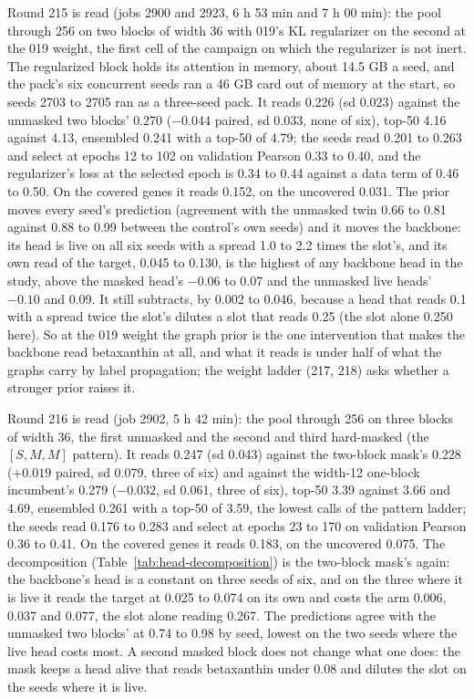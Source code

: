 Round 215 is read (jobs 2900 and 2923, 6 h 53 min and 7 h 00 min): the pool through 256
on two blocks of width 36 with 019's KL regularizer on the second at the 019 weight, the
first cell of the campaign on which the regularizer is not inert. The regularized block
holds its attention in memory, about 14.5 GB a seed, and the pack's six concurrent seeds
ran a 46 GB card out of memory at the start, so seeds 2703 to 2705 ran as a three-seed
pack. It reads 0.226 (sd 0.023) against the unmasked two blocks' 0.270 ($-0.044$
paired, sd 0.033, none of six), top-50 4.16 against 4.13, ensembled 0.241 with a top-50
of 4.79; the seeds read 0.201 to 0.263 and select at epochs 12 to 102 on validation
Pearson 0.33 to 0.40, and the regularizer's loss at the selected epoch is 0.34 to 0.44
against a data term of 0.46 to 0.50. On the covered genes it reads 0.152, on the
uncovered 0.031. The prior moves every seed's prediction (agreement with the unmasked
twin 0.66 to 0.81 against 0.88 to 0.99 between the control's own seeds) and it moves the
backbone: its head is live on all six seeds with a spread 1.0 to 2.2 times the slot's,
and its own read of the target, 0.045 to 0.130, is the highest of any backbone head in
the study, above the masked head's $-0.06$ to 0.07 and the unmasked live heads' $-0.10$
and 0.09. It still subtracts, by 0.002 to 0.046, because a head that reads 0.1 with a
spread twice the slot's dilutes a slot that reads 0.25 (the slot alone 0.250 here). So
at the 019 weight the graph prior is the one intervention that makes the backbone read
betaxanthin at all, and what it reads is under half of what the graphs carry by label
propagation; the weight ladder (217, 218) asks whether a stronger prior raises it.

Round 216 is read (job 2902, 5 h 42 min): the pool through 256 on three blocks of
width 36, the first unmasked and the second and third hard-masked (the $[S, M, M]$
pattern). It reads 0.247 (sd 0.043) against the two-block mask's 0.228 ($+0.019$
paired, sd 0.079, three of six) and against the width-12 one-block incumbent's 0.279
($-0.032$, sd 0.061, three of six), top-50 3.39 against 3.66 and 4.69, ensembled 0.261
with a top-50 of 3.59, the lowest calls of the pattern ladder; the seeds read 0.176 to
0.283 and select at epochs 23 to 170 on validation Pearson 0.36 to 0.41. On the covered
genes it reads 0.183, on the uncovered 0.075. The decomposition
(Table~\ref{tab:head-decomposition}) is the two-block mask's again: the backbone's head
is a constant on three seeds of six, and on the three where it is live it reads the
target at 0.025 to 0.074 on its own and costs the arm 0.006, 0.037 and 0.077, the
slot alone reading 0.267. The predictions agree with the unmasked two blocks' at 0.74
to 0.98 by seed, lowest on the two seeds where the live head costs most. A second
masked block does not change what one does: the mask keeps a head alive that reads
betaxanthin under 0.08 and dilutes the slot on the seeds where it is live.

